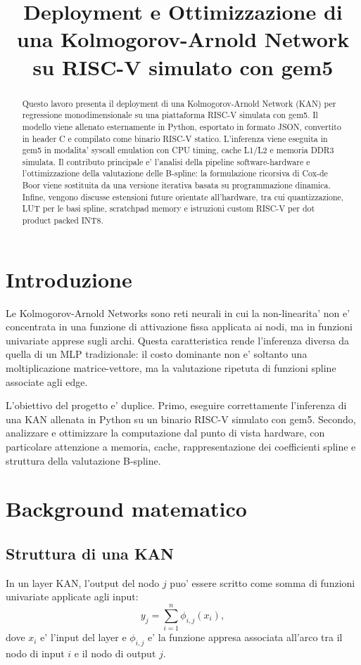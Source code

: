 \documentclass[conference]{IEEEtran}
\title{Deployment e Ottimizzazione di una Kolmogorov-Arnold Network su RISC-V simulato con gem5}
\author{%
\IEEEauthorblockN{Giovanni Vaccaro}
\IEEEauthorblockA{Progetto KAN su RISC-V/gem5\\
Email: inserire email}
}
\begin{document}
\maketitle

\begin{abstract}
Questo lavoro presenta il deployment di una Kolmogorov-Arnold Network (KAN) per regressione monodimensionale su una piattaforma RISC-V simulata con gem5. Il modello viene allenato esternamente in Python, esportato in formato JSON, convertito in header C e compilato come binario RISC-V statico. L'inferenza viene eseguita in gem5 in modalita' syscall emulation con CPU timing, cache L1/L2 e memoria DDR3 simulata. Il contributo principale e' l'analisi della pipeline software-hardware e l'ottimizzazione della valutazione delle B-spline: la formulazione ricorsiva di Cox-de Boor viene sostituita da una versione iterativa basata su programmazione dinamica. Infine, vengono discusse estensioni future orientate all'hardware, tra cui quantizzazione, LUT per le basi spline, scratchpad memory e istruzioni custom RISC-V per dot product packed INT8.
\end{abstract}

\section{Introduzione}
Le Kolmogorov-Arnold Networks sono reti neurali in cui la non-linearita' non e' concentrata in una funzione di attivazione fissa applicata ai nodi, ma in funzioni univariate apprese sugli archi. Questa caratteristica rende l'inferenza diversa da quella di un MLP tradizionale: il costo dominante non e' soltanto una moltiplicazione matrice-vettore, ma la valutazione ripetuta di funzioni spline associate agli edge.

L'obiettivo del progetto e' duplice. Primo, eseguire correttamente l'inferenza di una KAN allenata in Python su un binario RISC-V simulato con gem5. Secondo, analizzare e ottimizzare la computazione dal punto di vista hardware, con particolare attenzione a memoria, cache, rappresentazione dei coefficienti spline e struttura della valutazione B-spline.

\section{Background matematico}
\subsection{Struttura di una KAN}
In un layer KAN, l'output del nodo $j$ puo' essere scritto come somma di funzioni univariate applicate agli input:
\begin{equation}
    y_j = \sum_{i=1}^{n} \phi_{i,j}(x_i),
\end{equation}
dove $x_i$ e' l'input del layer e $\phi_{i,j}$ e' la funzione appresa associata all'arco tra il nodo di input $i$ e il nodo di output $j$.
\end{document}
